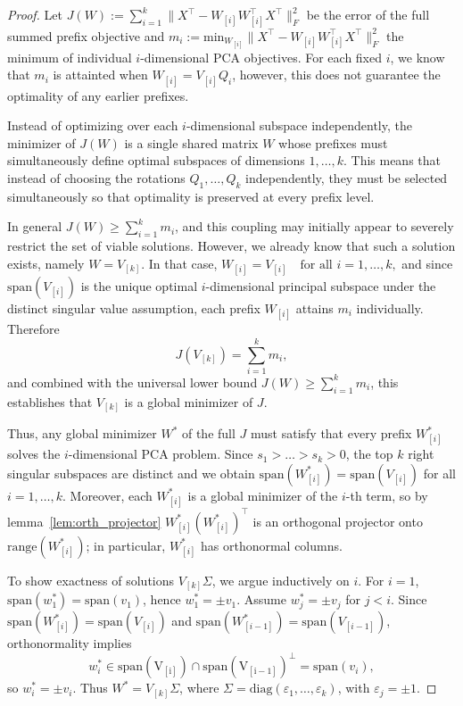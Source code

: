 \documentclass[twoside,11pt]{article}
\begin{document}
\begin{proof}
    Let $J(W):= \sum_{i=1}^k  \|X^\top-W_{[i]}W_{[i]}^\top X^\top\|_F^2$ be the error of the full summed prefix objective and $m_i:=\mathrm{min}_{W_{[i]}}\|X^\top-W_{[i]}W_{[i]}^\top X^\top\|_F^2$ the minimum of individual $i$-dimensional PCA objectives. For each fixed $i$, we know that $m_i$ is attainted when $W_{[i]} = V_{[i]}Q_i$, however, this does not guarantee the optimality of any earlier prefixes.

    Instead of optimizing over each $i$-dimensional subspace independently, the minimizer of $J(W)$ is a single shared matrix $W$ whose prefixes must simultaneously define optimal subspaces of dimensions $1, \ldots,
    k$. This means that instead of choosing the rotations $Q_1, \ldots, Q_k$ independently, they must be selected simultaneously so that optimality is preserved at every prefix level.

    In general $J(W)\geq \sum_{i=1}^k m_i$, and this coupling may initially appear to severely restrict the set of viable solutions. However, we already know that such a solution exists, namely $W = V_{[k]}$. In that case, $W_{[i]} = V_{[i]} \quad \text{for all } i = 1, \ldots, k,$ and since $\mathrm{span}(V_{[i]})$ is the unique optimal $i$-dimensional principal subspace under the distinct singular value assumption, each prefix $W_{[i]}$ attains $m_i$ individually. Therefore \[J(V_{[k]}) = \sum_{i=1}^k m_i,\] and combined with the universal lower bound $J(W) \geq \sum_{i=1}^k m_i$, this establishes that $V_{[k]}$ is a global minimizer of $J$.
    
    Thus, any global minimizer $W^*$ of the full $J$ must satisfy that every prefix $W^*_{[i]}$ solves the $i$-dimensional PCA problem. Since $s_1>\dots >s_k>0$, the top $k$ right singular subspaces are distinct and we obtain $\mathrm{span}(W^*_{[i]}) = \mathrm{span}(V_{[i]})$ for all $i=1,\dots, k$. Moreover, each $W^*_{[i]}$ is a global minimizer of the $i$-th term, so by lemma~\ref{lem:orth_projector} $W^*_{[i]}(W^*_{[i]})^\top$ is an orthogonal projector onto $\mathrm{range}(W^*_{[i]})$; in particular, $W^*_{[i]}$ has orthonormal columns.
    
    To show exactness of solutions $V_{[k]}\Sigma$, we argue inductively on $i$. For $i = 1$, $\mathrm{span}(w_1^*) = \mathrm{span}(v_1)$, hence $w_1^* = \pm v_1$. Assume $w_j^*= \pm v_j$ for $j<i$. Since $\mathrm{span}(W^*_{[i]}) = \mathrm{span}(V_{[i]})$ and $\mathrm{span}(W^*_{[i-1]}) = \mathrm{span}(V_{[i-1]})$, orthonormality implies \[w_i^*\in \mathrm{span(V_{[i]})\cap\mathrm{span(V_{[i-1]})^\perp}} = \mathrm{span}(v_i),\]
    so $w_i^* = \pm v_i$. Thus $W^* = V_{[k]}\Sigma$, where $\Sigma = \mathrm{diag}(\varepsilon_1, \dots, \varepsilon_k)$, with $\varepsilon_j = \pm 1$.
\end{proof}
\end{document}
